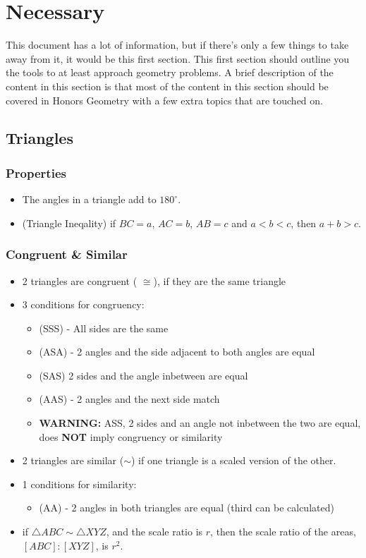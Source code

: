 \documentclass[11pt]{article}
\begin{document}
\section{Necessary}
This document has a lot of information, but if there's only a few things to take away from it, it would be this first section. This first section should outline you the tools
to at least approach geometry problems. A brief description of the content in this section is that most of the content in this section should be covered in Honors Geometry with a few extra topics that are touched on. 
\subsection{Triangles}
\subsubsection*{Properties}
\begin{itemize}
    \item The angles in a triangle add to $180^{\circ}$.
    \item (Triangle Ineqality) if $BC=a$, $AC=b$, $AB=c$ and $a < b < c$, then $a+b > c$. 
\end{itemize}
\subsubsection*{Congruent \& Similar}
\begin{itemize}
    \item 2 triangles are congruent ( $\cong$), if they are the same triangle
    \item 3 conditions for congruency:
     \begin{itemize}
            \item (SSS) - All sides are the same
            \item (ASA) - 2 angles and the side adjacent to both angles are equal
            \item (SAS) 2 sides and the angle inbetween are equal
            \item (AAS) - 2 angles and the next side match
            \item \textbf{WARNING: } ASS, 2 sides and an angle not inbetween the two are equal, does \textbf{NOT} imply congruency or similarity
        \end{itemize}
    \item 2 triangles are similar ($\sim$) if one triangle is a scaled version of the other. 
    \item 1 conditions for similarity:
     \begin{itemize}
            \item (AA) - 2 angles in both triangles are equal (third can be calculated)
        \end{itemize}
    \item if $\triangle ABC \sim \triangle XYZ$, and the scale ratio is $r$, then the scale ratio of the areas, $[ABC] : [XYZ]$, is $r^2$.
\end{itemize}
\end{document}
